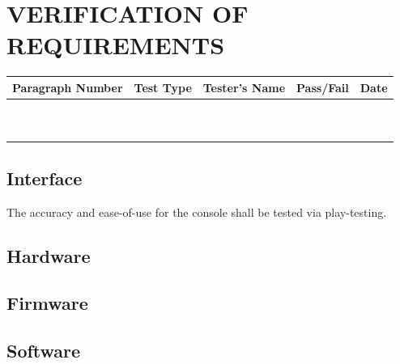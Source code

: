 \section{VERIFICATION OF REQUIREMENTS}

\begin{table}[h]
\centering
\begin{tabular}{|c|c|C{6cm}|c|c|}
\hline
\textbf{Paragraph Number} & \textbf{Test Type}& 
\textbf{Tester's Name} & \textbf{Pass/Fail} & \textbf{Date} \\
\hline
 & & & & \\
\hline
 & & & & \\
\hline
 & & & & \\
\hline
 & & & & \\
\hline
 & & & & \\
\hline
 & & & & \\
\hline
 & & & & \\
\hline
 & & & & \\
\hline
 & & & & \\
\hline
 & & & & \\
\hline
\end{tabular}
\end{table}

\subsection{Interface}
The accuracy and ease-of-use for the console shall be tested via play-testing.

\subsection{Hardware}


\subsection{Firmware}


\subsection{Software}

